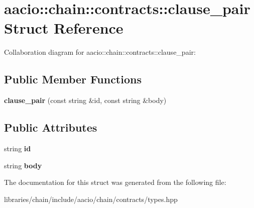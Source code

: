 \hypertarget{structaacio_1_1chain_1_1contracts_1_1clause__pair}{}\section{aacio\+:\+:chain\+:\+:contracts\+:\+:clause\+\_\+pair Struct Reference}
\label{structaacio_1_1chain_1_1contracts_1_1clause__pair}


Collaboration diagram for aacio\+:\+:chain\+:\+:contracts\+:\+:clause\+\_\+pair\+:
\subsection*{Public Member Functions}
\begin{DoxyCompactItemize}
\item 
\mbox{\label{structaacio_1_1chain_1_1contracts_1_1clause__pair_ae0636d8257cf72a41fdf073391511ee3}} 
{\bfseries clause\+\_\+pair} (const string \&id, const string \&body)
\end{DoxyCompactItemize}
\subsection*{Public Attributes}
\begin{DoxyCompactItemize}
\item 
\mbox{\label{structaacio_1_1chain_1_1contracts_1_1clause__pair_a700bb3c8fa0de2cfbfa42e00addea805}} 
string {\bfseries id}
\item 
\mbox{\label{structaacio_1_1chain_1_1contracts_1_1clause__pair_a84c8d0ad85c860174092abbc137d9b6a}} 
string {\bfseries body}
\end{DoxyCompactItemize}


The documentation for this struct was generated from the following file\+:\begin{DoxyCompactItemize}
\item 
libraries/chain/include/aacio/chain/contracts/types.\+hpp\end{DoxyCompactItemize}
